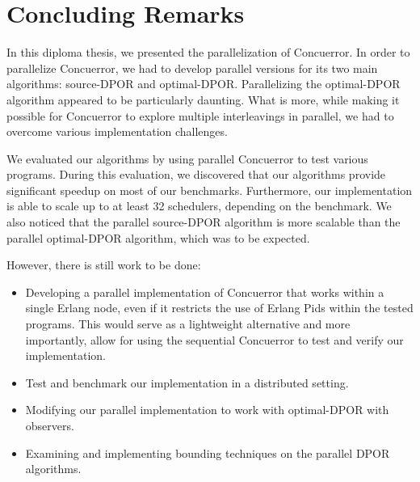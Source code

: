 \chapter{Concluding Remarks}
\label{conclusion}

In this diploma thesis, we presented the parallelization of Concuerror. In order to parallelize Concuerror, we had to develop parallel versions for its two main algorithms: source-DPOR and optimal-DPOR. Parallelizing the optimal-DPOR algorithm appeared to be particularly daunting.
What is more, while making it possible for Concuerror to explore multiple interleavings in parallel, we had to overcome various implementation challenges.

We evaluated our algorithms by using parallel Concuerror to test various programs. During this evaluation, we discovered that our algorithms provide significant speedup on most of our benchmarks. Furthermore, our implementation is able to scale up to at least 32 schedulers, depending on the benchmark. We also noticed that the parallel source-DPOR algorithm is more scalable than the parallel optimal-DPOR algorithm, which was to be expected. 


However, there is still work to be done:

\begin{itemize}

\item Developing a parallel implementation of Concuerror that works within a single Erlang node, even if it restricts the use of Erlang Pids within the tested programs. This would serve as a lightweight alternative and more importantly, allow for using the sequential Concuerror to test and verify our implementation. 

\item Test and benchmark our implementation in a distributed setting.

\item Modifying our parallel implementation to work with optimal-DPOR with observers.

\item Examining and implementing bounding techniques on the parallel DPOR algorithms.


\end{itemize}
